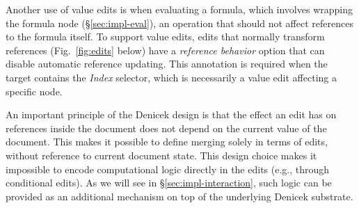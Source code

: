 \documentclass[sigconf]{acmart}
\newcommand{\note}[1]{}
\newcommand{\ident}[1]{{\sffamily #1}}
\begin{document}
Another use of value edits is when evaluating a formula, which involves wrapping the formula
node (\S\ref{sec:impl-eval}), an operation that should not affect references to the formula
itself. To support value edits, edits that normally transform references (Fig.~\ref{fig:edits} below)
have a \emph{reference behavior} option that can disable automatic reference
updating. This annotation is required when the target contains the \emph{Index} selector,
which is necessarily a value edit affecting a specific node.

%

An important principle of the Denicek design is that the effect an edit has on references inside
the document does not depend on the current value of the document. This makes it possible to
define merging solely in terms of edits, without reference to current document state.
This design choice makes it impossible to encode computational logic directly in the edits
(e.g., through conditional edits). As we will see in \S\ref{sec:impl-interaction}, such logic
can be provided as an additional mechanism on top of the underlying Denicek substrate.

\end{document}
